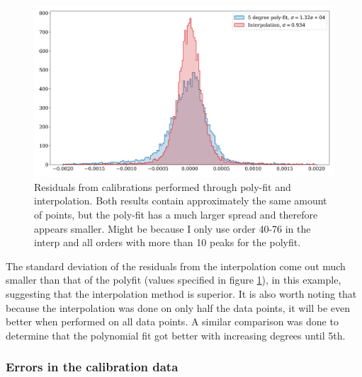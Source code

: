     \begin{figure}[ht]
        \centering
        \includegraphics[scale=0.40]{figures/hist_peak_residuals_poly_and_interp.png}
        \caption{Residuals from calibrations performed through poly-fit and interpolation. Both results contain approximately the same amount of points, but the poly-fit has a much larger spread and therefore appears smaller.  Might be because I only use order 40-76 in the interp and all orders with more than 10 peaks for the polyfit.  }
        \label{fig:calib_poly_vs_interp}
    \end{figure}

    The standard deviation of the residuals from the interpolation come out much smaller than that of the polyfit (values specified in figure \ref{fig:calib_poly_vs_interp}), in this example, suggesting that the interpolation method is superior. It is also worth noting that because the interpolation was done on only half the data points, it will be even better when performed on all data points. A similar comparison was done to determine that the polynomial fit got better with increasing degrees until 5th. 

    \vspace{0.5cm}




    \subsubsection{Errors in the calibration data}

